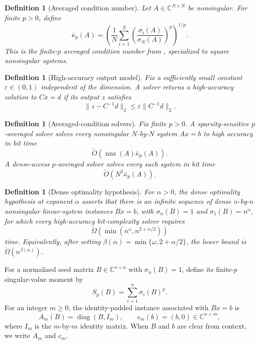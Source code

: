 \documentclass[11pt]{article}
\newtheorem{definition}[lemma]{Definition}
\begin{document}
\begin{definition}[Averaged condition number]
\label{def:averaged-condition}
Let $A\in\mathbb{C}^{N\times N}$ be nonsingular.  For finite $p>0$, define
\[
  \bar{\kappa}_p(A)=
  \left(\frac{1}{N}\sum_{i=1}^N
  \left(\frac{\sigma_i(A)}{\sigma_N(A)}\right)^p\right)^{1/p}.
\]
This is the finite-$p$ averaged condition number from
\cite[Definition 2.5]{AmselEtAl2026SimonsLinearSystems}, specialized to
square nonsingular systems.
\end{definition}

\begin{definition}[High-accuracy output model]
\label{def:high-accuracy}
Fix a sufficiently small constant $\varepsilon\in(0,1)$ independent of the
dimension.  A solver returns a high-accuracy solution to $Cx=d$ if its output
$z$ satisfies
\[
  \|z-C^{-1}d\|_2\leq \varepsilon\|C^{-1}d\|_2.
\]
\end{definition}

\begin{definition}[Averaged-condition solvers]
\label{def:averaged-solvers}
Fix finite $p>0$.  A sparsity-sensitive $p$-averaged solver solves every
nonsingular $N$-by-$N$ system $Ax=b$ to high accuracy in bit time
\[
  \widetilde{O}\left(\operatorname{nnz}(A)\bar{\kappa}_p(A)\right).
\]
A dense-access $p$-averaged solver solves every such system in bit time
\[
  \widetilde{O}\left(N^2\bar{\kappa}_p(A)\right).
\]
\end{definition}

\begin{definition}[Dense optimality hypothesis]
\label{def:dense-hardness}
For $\alpha>0$, the dense optimality hypothesis at exponent $\alpha$ asserts
that there is an infinite sequence of dense $n$-by-$n$ nonsingular linear-system
instances $Bx=b$, with $\sigma_n(B)=1$ and $\sigma_1(B)=n^{\alpha}$, for which
every high-accuracy bit-complexity solver requires
\[
  \widetilde{\Omega}\left(\min(n^{\omega},n^{2+\alpha/2})\right)
\]
time.  Equivalently, after setting
$\beta(\alpha)=\min\{\omega,2+\alpha/2\}$, the lower bound is
$\widetilde{\Omega}(n^{\beta(\alpha)})$.
\end{definition}

For a normalized seed matrix $B\in\mathbb{C}^{n\times n}$ with
$\sigma_n(B)=1$, define its finite-$p$ singular-value moment by
\[
  S_p(B)=\sum_{i=1}^n \sigma_i(B)^p.
\]
For an integer $m\geq0$, the identity-padded instance associated with
$Bx=b$ is
\[
  A_m(B)=\operatorname{diag}(B,I_m),\qquad
  c_m(b)=(b,0)\in\mathbb{C}^{n+m},
\]
where $I_m$ is the $m$-by-$m$ identity matrix.  When $B$ and $b$ are clear
from context, we write $A_m$ and $c_m$.
\end{document}

